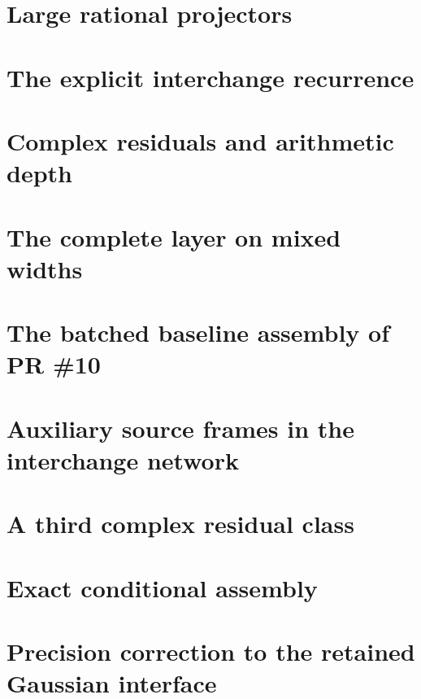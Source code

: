 \documentclass[11pt]{article}
\numberwithin{equation}{section}
\begin{document}
\section{Large rational projectors}


\section{The explicit interchange recurrence}




\section{Complex residuals and arithmetic depth}



\section{The complete layer on mixed widths}


\section{The batched baseline assembly of PR \#10}


\section{Auxiliary source frames in the interchange network}


\section{A third complex residual class}


\section{Exact conditional assembly}


\section{Precision correction to the retained Gaussian interface}

\end{document}
